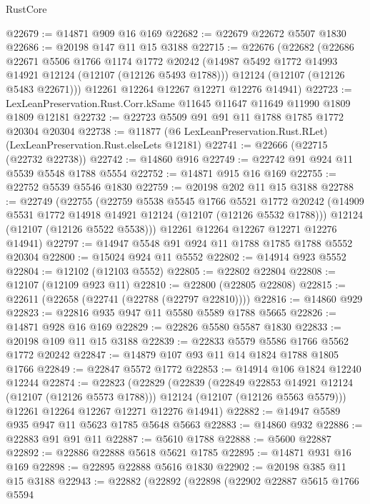 \begin{lexlean}{RustCore}
\begin{coremodule}
@22679 := @14871 @909 @16 @169
@22682 := @22679 @22672 @5507 @1830
@22686 := @20198 @147 @11 @15 @3188
@22715 := @22676
    (@22682
      (@22686
        @22671
        @5506
        @1766
        @1174
        @1772
        @20242
        (@14987 @5492 @1772 @14993 @14921 @12124 (@12107 (@12126 @5493 @1788)))
        @12124
        (@12107 (@12126 @5483 @22671)))
      @12261
      @12264
      @12267
      @12271
      @12276
      @14941)
@22723 := LexLeanPreservation.Rust.Corr.kSame @11645 @11647 @11649 @11990 @1809 @1809 @12181
@22732 := @22723 @5509 @91 @91 @11 @1788 @1785 @1772 @20304 @20304
@22738 := @11877 (@6 LexLeanPreservation.Rust.RLet) (LexLeanPreservation.Rust.elseLets @12181)
@22741 := @22666 (@22715 (@22732 @22738))
@22742 := @14860 @916
@22749 := @22742 @91 @924 @11 @5539 @5548 @1788 @5554
@22752 := @14871 @915 @16 @169
@22755 := @22752 @5539 @5546 @1830
@22759 := @20198 @202 @11 @15 @3188
@22788 := @22749
    (@22755
      (@22759
        @5538
        @5545
        @1766
        @5521
        @1772
        @20242
        (@14909 @5531 @1772 @14918 @14921 @12124 (@12107 (@12126 @5532 @1788)))
        @12124
        (@12107 (@12126 @5522 @5538)))
      @12261
      @12264
      @12267
      @12271
      @12276
      @14941)
@22797 := @14947 @5548 @91 @924 @11 @1788 @1785 @1788 @5552 @20304
@22800 := @15024 @924 @11 @5552
@22802 := @14914 @923 @5552
@22804 := @12102 (@12103 @5552)
@22805 := @22802 @22804
@22808 := @12107 (@12109 @923 @11)
@22810 := @22800 (@22805 @22808)
@22815 := @22611 (@22658 (@22741 (@22788 (@22797 @22810))))
@22816 := @14860 @929
@22823 := @22816 @935 @947 @11 @5580 @5589 @1788 @5665
@22826 := @14871 @928 @16 @169
@22829 := @22826 @5580 @5587 @1830
@22833 := @20198 @109 @11 @15 @3188
@22839 := @22833 @5579 @5586 @1766 @5562 @1772 @20242
@22847 := @14879 @107 @93 @11 @14 @1824 @1788 @1805 @1766
@22849 := @22847 @5572 @1772
@22853 := @14914 @106 @1824 @12240 @12244
@22874 := @22823
    (@22829
      (@22839
        (@22849 @22853 @14921 @12124 (@12107 (@12126 @5573 @1788)))
        @12124
        (@12107 (@12126 @5563 @5579)))
      @12261
      @12264
      @12267
      @12271
      @12276
      @14941)
@22882 := @14947 @5589 @935 @947 @11 @5623 @1785 @5648 @5663
@22883 := @14860 @932
@22886 := @22883 @91 @91 @11
@22887 := @5610 @1788
@22888 := @5600 @22887
@22892 := @22886 @22888 @5618 @5621 @1785
@22895 := @14871 @931 @16 @169
@22898 := @22895 @22888 @5616 @1830
@22902 := @20198 @385 @11 @15 @3188
@22943 := @22882
    (@22892
      (@22898
        (@22902
          @22887
          @5615
          @1766
          @5594

\end{coremodule}
\end{lexlean}
